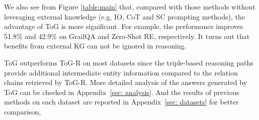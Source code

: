 \documentclass{article} %
\begin{document}
We also see from Figure \ref{table:main} that, compared with those methods without leveraging external knowledge (e.g, IO, CoT and SC prompting methods), the advantage of ToG is more significant. For example, the performance improves 51.8\% and 42.9\% on GrailQA and Zero-Shot RE, respectively. It turns out that benefits from external KG can not be ignored in reasoning. 

ToG outperforms ToG-R on most datasets since the triple-based reasoning paths provide additional intermediate entity information compared to the relation chains retrieved by ToG-R. More detailed analysis of the answers generated by ToG can be checked in Appendix~\ref{sec: analysis}. And the results of previous methods on each dataset are reported in Appendix~\ref{sec: datasets} for better comparison,



\end{document}
